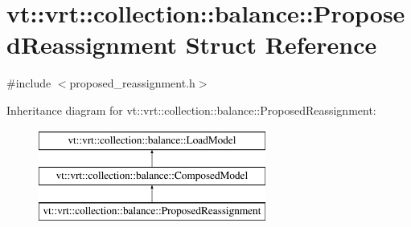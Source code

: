 \hypertarget{structvt_1_1vrt_1_1collection_1_1balance_1_1_proposed_reassignment}{}\section{vt\+:\+:vrt\+:\+:collection\+:\+:balance\+:\+:Proposed\+Reassignment Struct Reference}
\label{structvt_1_1vrt_1_1collection_1_1balance_1_1_proposed_reassignment}


{\ttfamily \#include $<$proposed\+\_\+reassignment.\+h$>$}

Inheritance diagram for vt\+:\+:vrt\+:\+:collection\+:\+:balance\+:\+:Proposed\+Reassignment\+:\begin{figure}[H]
\begin{center}
\leavevmode
\includegraphics[height=3.000000cm]{structvt_1_1vrt_1_1collection_1_1balance_1_1_proposed_reassignment}
\end{center}
\end{figure}
